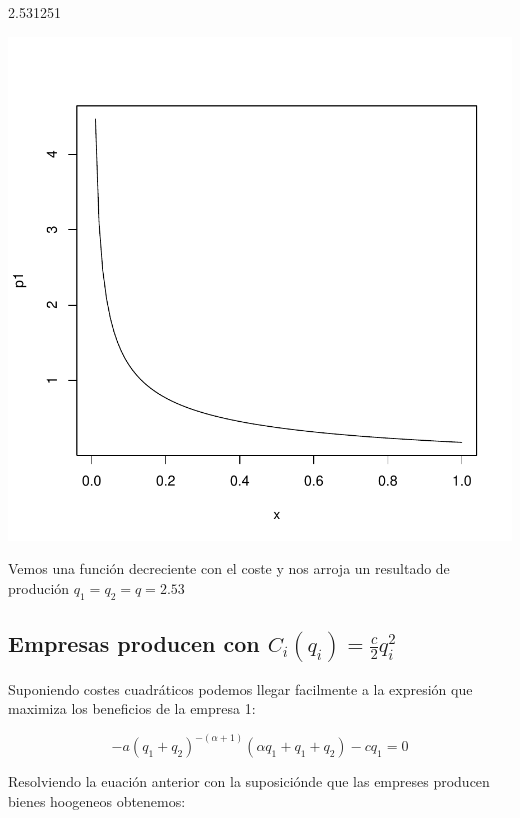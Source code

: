 \documentclass{article}
\begin{document}
\begin{Schunk}
\begin{Soutput}
[1] 2.531251
\end{Soutput}
\end{Schunk}
\includegraphics{PUTAPRUEBA-001}

Vemos una función decreciente con el coste y nos arroja un resultado de produción $q_1=q_2=q=2.53$

\subsection{Empresas producen con $C_i(q_i)=\frac{c}{2}q_i^2$}

Suponiendo costes cuadr\'aticos podemos llegar facilmente a la expresión que maximiza los beneficios de la empresa 1:

  $$-a(q_1+q_2)^{-(\alpha+1)}(\alpha q_1+q_1+q_2)-cq_1=0$$

Resolviendo la euación anterior con la suposici\'onde que las empreses producen bienes hoogeneos obtenemos:
  
\end{document}
